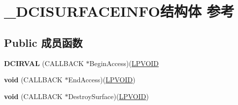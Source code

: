 \hypertarget{struct___d_c_i_s_u_r_f_a_c_e_i_n_f_o}{}\section{\+\_\+\+D\+C\+I\+S\+U\+R\+F\+A\+C\+E\+I\+N\+F\+O结构体 参考}
\label{struct___d_c_i_s_u_r_f_a_c_e_i_n_f_o}
\subsection*{Public 成员函数}
\begin{DoxyCompactItemize}
\item 
\mbox{\label{struct___d_c_i_s_u_r_f_a_c_e_i_n_f_o_a1689f191cd7ea1be4766b9ae6f7fdb8e}} 
{\bfseries D\+C\+I\+R\+V\+AL} (C\+A\+L\+L\+B\+A\+CK $\ast$Begin\+Access)(\hyperlink{interfacevoid}{L\+P\+V\+O\+ID}
\item 
\mbox{\label{struct___d_c_i_s_u_r_f_a_c_e_i_n_f_o_a58e82900f38470a137746feda68aea35}} 
{\bfseries void} (C\+A\+L\+L\+B\+A\+CK $\ast$End\+Access)(\hyperlink{interfacevoid}{L\+P\+V\+O\+ID})
\item 
\mbox{\label{struct___d_c_i_s_u_r_f_a_c_e_i_n_f_o_a6852d4d939c65f2d79bce25d2d17f62f}} 
{\bfseries void} (C\+A\+L\+L\+B\+A\+CK $\ast$Destroy\+Surface)(\hyperlink{interfacevoid}{L\+P\+V\+O\+ID})
\end{DoxyCompactItemize}
